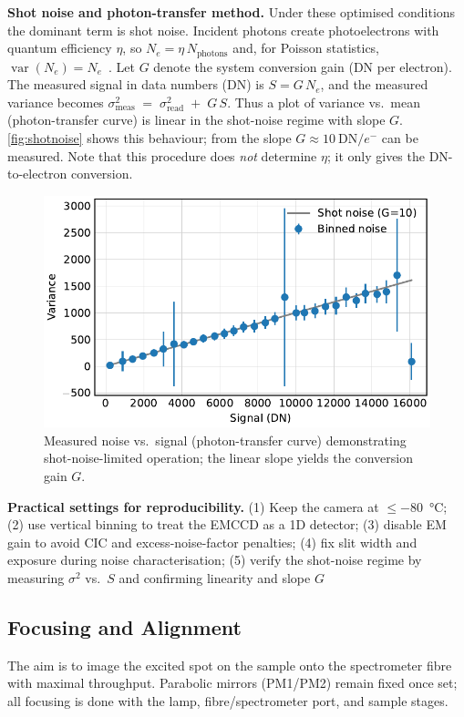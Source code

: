 \documentclass[
	parskip=half,
	a4paper,
]{scrarticle}
\begin{document}
\textbf{Shot noise and photon-transfer method.}
Under these optimised conditions the dominant term is shot noise.
Incident photons create photoelectrons with quantum efficiency \(\eta\), so \(N_e=\eta\,N_{\text{photons}}\) and, for Poisson statistics, \(\operatorname{var}(N_e)=N_e\)~\cite{europeanmachinevisionassociationStandardCharacterizationImage2010}.
Let \(G\) denote the system conversion gain (DN per electron). The measured signal in data numbers (DN) is \(S = G\,N_e\), and the measured variance becomes \(\sigma^2_{\text{meas}} \;=\; \sigma_{\text{read}}^2 \;+\; G\,S\).
Thus a plot of variance vs.\ mean (photon-transfer curve) is linear in the shot-noise regime with slope \(G\).
\autoref{fig:shotnoise} shows this behaviour; from the slope \(G \approx 10~\text{DN}/e^{-}\) can be measured.
Note that this procedure does \emph{not} determine \(\eta\); it only gives the DN-to-electron conversion.

\begin{figure}[h]
    \centering
    \includegraphics{../analysis/figures/shot noise.pdf}
    \caption{Measured noise vs.\ signal (photon-transfer curve) demonstrating shot-noise-limited operation; the linear slope yields the conversion gain \(G\).}
    \label{fig:shotnoise}
\end{figure}

\textbf{Practical settings for reproducibility.}
(1) Keep the camera at \(\leq\)\SI{-80}{\degreeCelsius}; (2) use vertical binning to treat the EMCCD as a 1D detector; (3) disable EM gain to avoid CIC and excess-noise-factor penalties; (4) fix slit width and exposure during noise characterisation; (5) verify the shot-noise regime by measuring \(\sigma^2\) vs.\ \(S\) and confirming linearity and slope \(G\)

\subsection{Focusing and Alignment}
The aim is to image the excited spot on the sample onto the spectrometer fibre with maximal throughput. Parabolic mirrors (PM1/PM2) remain fixed once set; all focusing is done with the lamp, fibre/spectrometer port, and sample stages.
\end{document}
